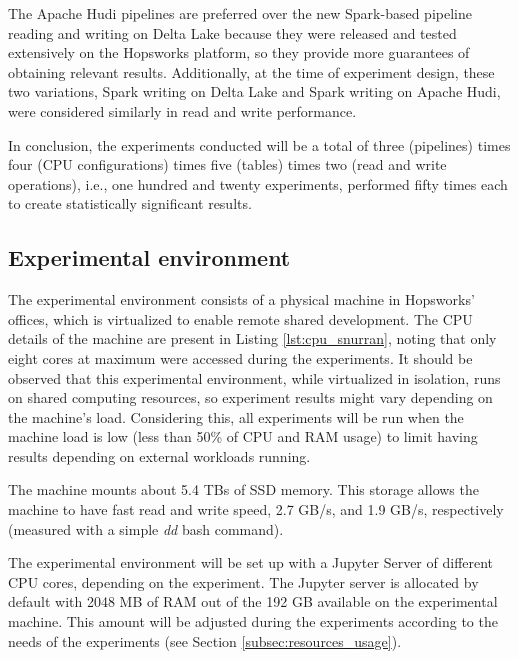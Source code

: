 The Apache Hudi pipelines are preferred over the new Spark-based pipeline reading and writing on Delta Lake because they were released and tested extensively on the Hopsworks platform, so they provide more guarantees of obtaining relevant results. Additionally, at the time of experiment design, these two variations, Spark writing on Delta Lake and Spark writing on Apache Hudi, were considered similarly in read and write performance. 

In conclusion, the experiments conducted will be a total of three (pipelines) times four (\gls{CPU} configurations) times five (tables) times two (read and write operations), i.e., one hundred and twenty experiments, performed fifty times each to create statistically significant results.

\subsection{Experimental environment}
\label{subsec:exp_env}

The experimental environment consists of a physical machine in Hopsworks' offices, which is virtualized to enable remote shared development. The \gls{CPU} details of the machine are present in Listing \ref{lst:cpu_snurran}, noting that only eight cores at maximum were accessed during the experiments. It should be observed that this experimental environment, while virtualized in isolation, runs on shared computing resources, so experiment results might vary depending on the machine's load. Considering this, all experiments will be run when the machine load is low (less than 50\% of \gls{CPU} and \gls{RAM} usage) to limit having results depending on external workloads running.

The machine mounts about 5.4 TBs of \gls{SSD} memory. This storage allows the machine to have fast read and write speed, 2.7 GB/s, and 1.9 GB/s, respectively (measured with a simple \textit{dd} bash command). 

The experimental environment will be set up with a Jupyter Server of different CPU cores, depending on the experiment. The Jupyter server is allocated by default with 2048 MB of \gls{RAM} out of the 192 GB  available on the experimental machine. This amount will be adjusted during the experiments according to the needs of the experiments (see Section \ref{subsec:resources_usage}).

